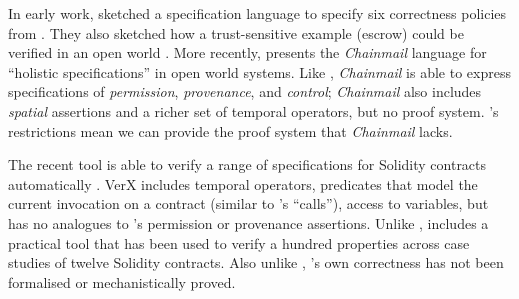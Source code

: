 %
% 
%
%

In early work, 
\cite{WAS-OOPSLA14-TR} %
sketched a  specification language to
specify six correctness policies from \cite{MillerPhD}. %
They also
  sketched how 
a trust-sensitive 
example (escrow) could be verified in an open world
\cite{swapsies}. More recently, 
\cite{FASE} presents the \emph{Chainmail} language for
``holistic specifications'' in open world systems.
Like \Nec, \emph{Chainmail} is able to express specifications of
\emph{permission}, \emph{provenance}, and \emph{control}; \emph{Chainmail}
also includes \emph{spatial} assertions and a richer set of temporal
operators, but no proof system. 
\Nec's restrictions mean 
we can provide the proof system that \emph{Chainmail} lacks.



The recent {} tool is able to verify a range of
specifications for Solidity contracts automatically \cite{VerX}.
VerX includes  temporal operators, predicates that
model the current invocation on a contract (similar to \Nec's
``calls''), access to variables, 
{
but} has no analogues to \Nec's permission or provenance assertions.
%
%
Unlike \Nec, {} includes a practical tool that has
been used to verify a hundred properties across case studies of
twelve Solidity contracts. Also unlike \Nec, {}'s own correctness
has not been formalised or mechanistically proved. 

